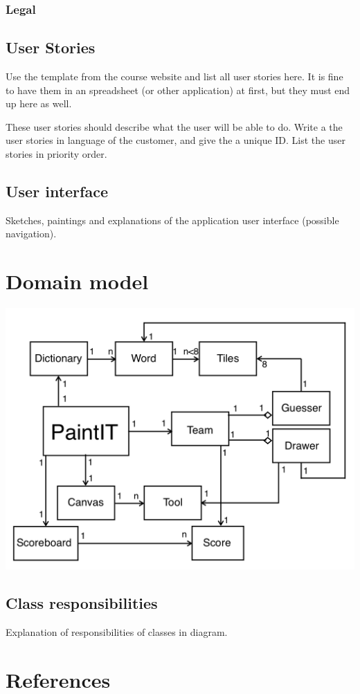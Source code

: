 \documentclass[12pt,a4paper]{scrartcl}
\begin{document}
\subsubsection{Legal}

\subsection{User Stories}
Use the template from the course website and list all user stories here. It is
fine to have them in an spreadsheet (or other application) at first, but they 
must end up here as well.

These user stories should describe what the user will be able to do. Write a 
the user stories in language of the customer, and give the a unique ID. List the
user stories in priority order.

\subsection{User interface}

Sketches, paintings and explanations of the application user interface (possible
navigation).


\section{Domain model}

\includegraphics[width=\textwidth]{domainModel.png}

\subsection{Class responsibilities}

Explanation of responsibilities of classes in diagram.


\section{References}
\end{document}
